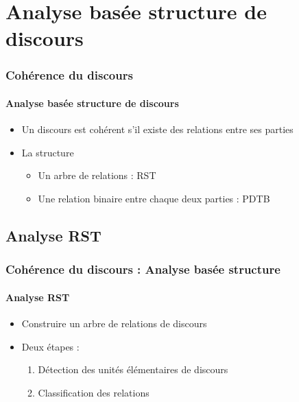 \documentclass[xcolor=table]{beamer}
\begin{document}
\begin{frame}
	
\end{frame}

\section{Analyse basée structure de discours}

\begin{frame}
	\frametitle{Cohérence du discours}
	\framesubtitle{Analyse basée structure de discours}
	
	\begin{itemize}
		\item Un discours est cohérent s'il existe des relations entre ses parties
		\item La structure
		\begin{itemize}
			\item Un arbre de relations : RST
			\item Une relation binaire entre chaque deux parties : PDTB
		\end{itemize}
	\end{itemize}
	
\end{frame}

\subsection{Analyse RST}

\begin{frame}
	\frametitle{Cohérence du discours : Analyse basée structure}
	\framesubtitle{Analyse RST}
	
	\begin{itemize}
		\item Construire un arbre de relations de discours
		\item Deux étapes : 
		\begin{enumerate}
			\item Détection des unités élémentaires de discours
			\item Classification des relations
		\end{enumerate}
	\end{itemize}

	\begin{center}
	\end{center}
	
\end{frame}
\end{document}
